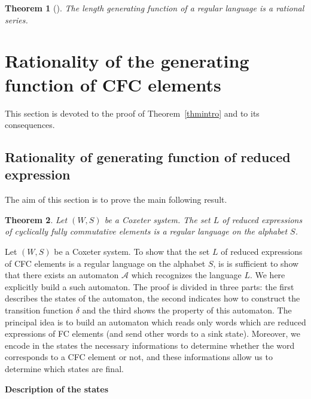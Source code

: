 \documentclass[reqno,12pt]{amsart}
\newtheorem{Theorem}{Theorem}[section]
\theoremstyle{definition}
\begin{document}
\begin{Theorem}[{\cite{HOP}}]\label{kleene}
The length generating function of a regular language is a rational series.
\end{Theorem}

\section{Rationality of the generating function of CFC elements}\label{preuverecauto}

This section is devoted to the proof of Theorem~\ref{thmintro} and to its consequences.

\subsection{Rationality of generating function of reduced expression}
The aim of this section is to prove the main following result.
 \begin{Theorem}\label{thmautomate}
 Let $(W,S)$ be a Coxeter system. The set $L$ of reduced expressions of cyclically fully commutative elements is a regular language on the alphabet $S$.
 \end{Theorem}
 

Let $(W,S)$ be a Coxeter system. To show that the set $L$ of reduced expressions of CFC elements is a regular language on the alphabet $S$,  is is sufficient to show that there exists an automaton $\mathcal{A}$ which recognizes the language $L$. We here explicitly build a such automaton. The proof is divided in three parts: the first describes the states of the automaton, the second indicates how to construct the transition function $\delta$ and the third shows the property of this automaton. The principal idea is to build an automaton which reads only words which are reduced expressions of FC elements (and send other words to a sink state). Moreover, we encode in the states the necessary informations to determine whether the word corresponds to a CFC element or not, and these informations allow us to determine which states are  final.
\medskip

{\bf Description of the states}
 
\end{document}
